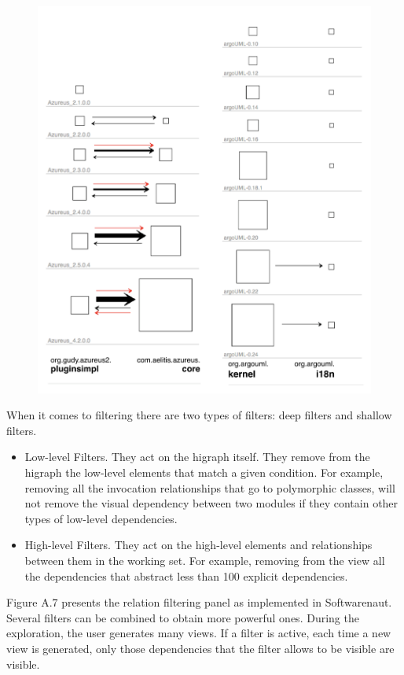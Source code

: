 \documentclass[preprint,12pt]{elsarticle}
\begin{document}
\begin{figure}[ht!]
\begin{center}
\includegraphics[width=0.7\linewidth]{images/Filmstrip}
\caption{}
\label{}
\end{center}
\end{figure}


When it comes to filtering there are two types of filters: deep filters and shallow filters.

\begin{itemize}

\item Low-level Filters. They act on the higraph itself. They remove from the higraph the low-level elements that match a given condition. For example, removing all the invocation relationships that go to polymorphic classes, will not remove the visual dependency between two modules if they contain other types of low-level dependencies.

\item High-level Filters. They act on the high-level elements and relationships between them in the working set. For example, removing from the view all the dependencies that abstract less than 100 explicit dependencies.

\end{itemize}


Figure A.7 presents the relation filtering panel as implemented in Softwarenaut. Several filters can be combined to obtain more powerful ones. During the exploration, the user generates many views. If a filter is active, each time a new view is generated, only those dependencies that the filter allows to be visible are visible.
\end{document}
